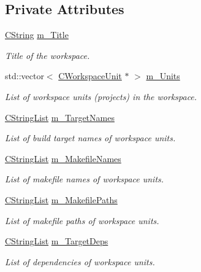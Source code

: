 \subsection*{Private Attributes}
\begin{DoxyCompactItemize}
\item 
\hyperlink{classCString}{C\-String} \hyperlink{classCCodeBlocksWorkspace_adbae0f57273b1e8e46b983859942476a}{m\-\_\-\-Title}
\begin{DoxyCompactList}\small\item\em Title of the workspace. \end{DoxyCompactList}\item 
std\-::vector$<$ \hyperlink{classCWorkspaceUnit}{C\-Workspace\-Unit} $\ast$ $>$ \hyperlink{classCCodeBlocksWorkspace_aa76c64684c8b462b93a7066477a8e8fc}{m\-\_\-\-Units}
\begin{DoxyCompactList}\small\item\em List of workspace units (projects) in the workspace. \end{DoxyCompactList}\item 
\hyperlink{classCStringList}{C\-String\-List} \hyperlink{classCCodeBlocksWorkspace_aad71e4af12c3f47eea577bef49a71433}{m\-\_\-\-Target\-Names}
\begin{DoxyCompactList}\small\item\em List of build target names of workspace units. \end{DoxyCompactList}\item 
\hyperlink{classCStringList}{C\-String\-List} \hyperlink{classCCodeBlocksWorkspace_a6d068259798bb7878ebbac957cdc8c58}{m\-\_\-\-Makefile\-Names}
\begin{DoxyCompactList}\small\item\em List of makefile names of workspace units. \end{DoxyCompactList}\item 
\hyperlink{classCStringList}{C\-String\-List} \hyperlink{classCCodeBlocksWorkspace_aa1b3293bb2f0a1ae7783bb645f216f62}{m\-\_\-\-Makefile\-Paths}
\begin{DoxyCompactList}\small\item\em List of makefile paths of workspace units. \end{DoxyCompactList}\item 
\hyperlink{classCStringList}{C\-String\-List} \hyperlink{classCCodeBlocksWorkspace_a5e1d4659d90551a37aa3f9f2254dff34}{m\-\_\-\-Target\-Deps}
\begin{DoxyCompactList}\small\item\em List of dependencies of workspace units. \end{DoxyCompactList}\item 

\end{DoxyCompactItemize}
